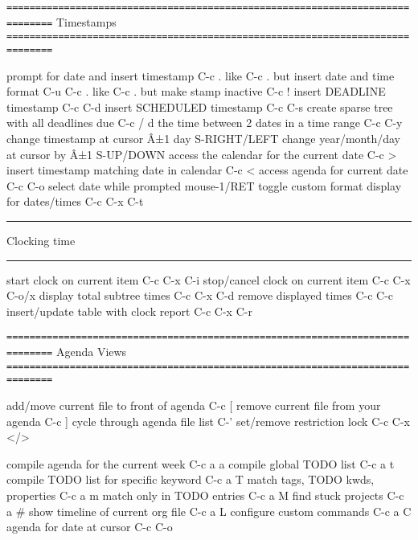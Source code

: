 \documentclass[10pt,a4paper]{article}
\begin{document}
\texttt{==============================================================================}
Timestamps
\texttt{==============================================================================}

prompt for date and insert timestamp              C-c .
like C-c . but insert date and time format        C-u C-c .
like C-c . but make stamp inactive                C-c !
insert DEADLINE timestamp                         C-c C-d
insert SCHEDULED timestamp                        C-c C-s
create sparse tree with all deadlines due         C-c / d
the time between 2 dates in a time range          C-c C-y
change timestamp at cursor Â±1 day                S-RIGHT/LEFT\notetwo
change year/month/day at cursor by Â±1            S-UP/DOWN\notetwo
access the calendar for the current date          C-c >
insert timestamp matching date in calendar        C-c <
access agenda for current date                    C-c C-o
select date while prompted                        mouse-1/RET
toggle custom format display for dates/times      C-c C-x C-t


\rule{\linewidth}{0.5pt}
Clocking time

\rule{\linewidth}{0.5pt}

start clock on current item                       C-c C-x C-i
stop/cancel clock on current item                 C-c C-x C-o/x
display total subtree times                       C-c C-x C-d
remove displayed times                            C-c C-c
insert/update table with clock report             C-c C-x C-r

\texttt{==============================================================================}
Agenda Views
\texttt{==============================================================================}

add/move current file to front of agenda          C-c [
remove current file from your agenda              C-c ]
cycle through agenda file list                    C-'
set/remove restriction lock                       C-c C-x </>

compile agenda for the current week               C-c a a \noteone
compile global TODO list                          C-c a t \noteone
compile TODO list for specific keyword            C-c a T \noteone
match tags, TODO kwds, properties                 C-c a m \noteone
match only in TODO entries                        C-c a M \noteone
find stuck projects                               C-c a \# \noteone
show timeline of current org file                 C-c a L \noteone
configure custom commands                         C-c a C \noteone
agenda for date at cursor                         C-c C-o
\end{document}
